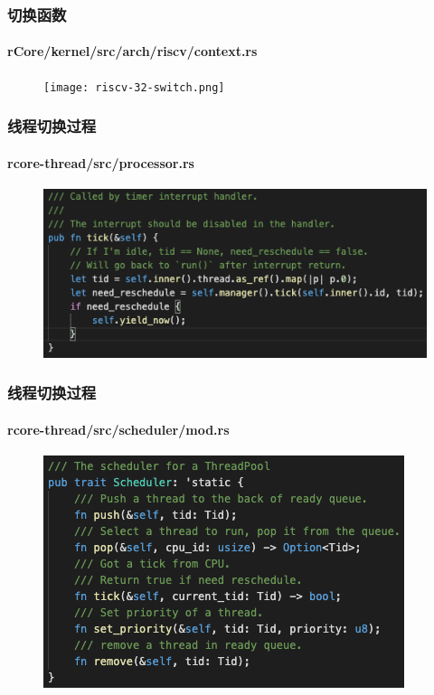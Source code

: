 \begin{frame}[fragile]
    \frametitle{切换函数}
    \framesubtitle{rCore/kernel/src/arch/riscv/context.rs}
    \begin{figure}
    \texttt{[image: riscv-32-switch.png]}
    \end{figure}

\end{frame}
% 
% 
% 
% 
% 
\begin{frame}[fragile]
    \frametitle{线程切换过程}
    \framesubtitle{rcore-thread/src/processor.rs}
    \begin{figure}
    \includegraphics[width=0.8\linewidth]{figs/fn-tick.png}
    \end{figure}
\end{frame}

\begin{frame}[fragile]
    \frametitle{线程切换过程}
    \framesubtitle{rcore-thread/src/scheduler/mod.rs}
    \begin{figure}
    \includegraphics[width=0.65\linewidth]{figs/scheduler.png}
    \end{figure}

\end{frame}
% 
% 
% 
% 
% 

